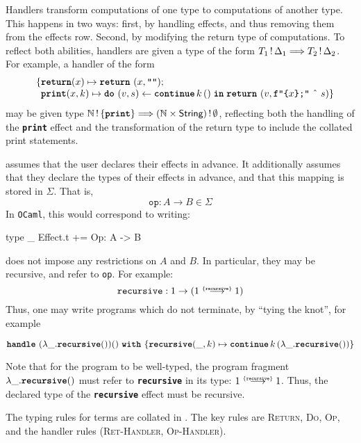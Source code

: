 Handlers transform computations of one type to computations of another type. This happens in two ways: first, by handling effects, and thus removing them from the effects row. Second, by modifying the return type of computations. To reflect both abilities, handlers are given a type of the form $\handlerType{\effectType[\Delta_1]{T_1}}{\effectType[\Delta_2]{T_2}}$. For example, a handler of the form  
\[ \begin{array}{ll}
  \quad \{ \textbf{\texttt{return}}(x) \mapsto {\return{(x, \texttt{""})}}; \\
    \quad \, \,\, \textbf{\texttt{print}}(x, k) \mapsto {\bind{(v, s)}{\continue{k}{()}}{\return{(v, \texttt{f"\{$x$\};"} \text{ \^\ } s)}}}\}
  \end{array}
\]
may be given type $\handlerType{\effectType[\{ \textbf{\texttt{print}} \}]{\mathbb{N}}}{\effectType[\emptyset]{(\mathbb{N} \times \textsf{String})}}$, reflecting both the handling of the \textbf{\texttt{print}} effect and the transformation of the return type to include the collated print statements.

\efflang{} assumes that the user declares their effects in advance. It additionally assumes that they declare the types of their effects in advance, and that this mapping is stored in $\Sigma$. That is, 
\[\texttt{op}: A \to B \in \Sigma \]
In \texttt{OCaml}, this would correspond to writing:
\begin{ocaml}
type _ Effect.t += Op: A -> B
\end{ocaml}
\efflang{} does not impose any restrictions on $A$ and $B$. In particular, they may be recursive, and refer to \texttt{op}. For example:
\[\texttt{recursive}: 1 \to (\functionType[\{ \texttt{recursive} \}]{1}{1})\]
Thus, one may write programs which do not terminate, by ``tying the knot'', for example 
\begin{eff}
  $\handleWith{(\lambda \_ . \textbf{\texttt{recursive}} ()) ()}{\textbf{\texttt{recursive}}(\_, k) \mapsto {\continue{k}{(\lambda \_. \textbf{\texttt{recursive}} ())}}}$
\end{eff}
Note that for the program to be well-typed, the program fragment $\lambda \_. \textbf{\texttt{recursive}} ()$ must refer to \textbf{\texttt{recursive}} in its type: $\functionType[\{ \texttt{recursive} \}]{1}{1}$. Thus, the declared type of the \textbf{\texttt{recursive}} effect must be recursive. 

The typing rules for terms are collated in . The key rules are \textsc{Return}, \textsc{Do}, \textsc{Op}, and the handler rules (\textsc{Ret-Handler}, \textsc{Op-Handler}).

